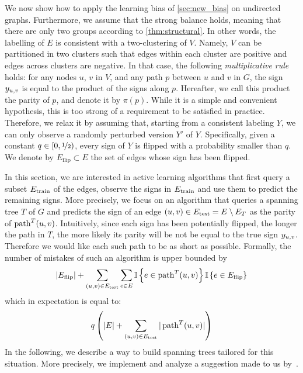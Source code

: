 We now show how to apply the learning bias of \autoref{sec:new_bias} on undirected graphs.
Furthermore, we assume that the strong balance holds, meaning that there are only two groups
according to \autoref{thm:structural}. In other words, the labelling of $E$ is consistent with a
two-clustering of $V$. Namely, $V$ can be partitioned in two clusters such that edges within each
cluster are positive and edges across clusters are negative.
In that case, the following
\emph{multiplicative rule} holds: for any nodes $u$, $v$ in $V$, and any path $p$ between $u$ and
$v$ in $G$, the sign $y_{u, v}$ is equal to the product of the signs along $p$. Hereafter, we call this
product the parity of $p$, and denote it by $\pi(p)$.
While it is a simple and convenient hypothesis, this is too strong
of a requirement to be satisfied in practice. Therefore, we relax it by assuming that, starting from
a consistent labeling $Y$, we can only observe a randomly perturbed version $Y'$ of $Y$.
Specifically, given a constant $q\in [0, \nicefrac{1}{2})$, every sign of $Y$ is flipped with a
probability smaller than $q$. We denote by $E_{\mathrm{flip}} \subset E$ the set of edges whose sign
has been flipped.

In this section, we are interested in active learning algorithms that first query a subset
$E_{\mathrm{train}}$ of the edges, observe the signs in $E_{\mathrm{train}}$ and use them to predict the remaining signs.
More precisely, we focus on an algorithm that queries a spanning tree $T$ of $G$ and predicts the
sign of an edge $(u,v) \in E_{\mathrm{test}} = E \setminus E_T$ as the parity of $\operatorname{path}^T(u, v)$. Intuitively, since
each sign has been potentially flipped, the longer the path in $T$, the more likely its parity will
be not be equal to the true sign $y_{u, v}{}$. Therefore we would like each such path to be as short as
possible.
Formally, the number of mistakes of such an algorithm is upper bounded by~\autocite[Equation
(3)]{Cesa-Bianchi2012b}
\begin{equation*}
  |E_{\mathrm{flip}}| + \sum_{(u,v) \in E_{\mathrm{test}}}
  \sum_{e\in E} \mathbb{I}\left\{{e \in \operatorname{path}^T(u, v)}\right\} \mathbb{I}\left\{{e \in E_{\mathrm{flip}}}\right\}
\end{equation*}
which in expectation is equal to:
\begin{equation}
  \label{eq:stretch_mistakes}
  q\left(|E| + \sum_{(u,v) \in E_{\mathrm{test}}} |\operatorname{path}^T(u, v)| \right)
\end{equation}
In the following, we describe a way to build spanning trees tailored for this situation. More
precisely, we implement and analyze a suggestion made to us by~\autocite{gtxFabio}.

